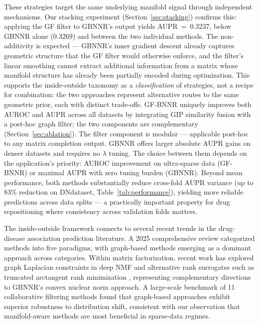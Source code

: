 \documentclass[unnumsec,webpdf,contemporary,large]{oup-authoring-template}
\begin{document}
These strategies target the same underlying manifold signal through independent mechanisms. Our stacking experiment (Section~\ref{sec:stacking}) confirms this: applying the GF filter to GBNNR's output yields AUPR~=~0.3237, below GBNNR alone (0.3269) and between the two individual methods. The non-additivity is expected --- GBNNR's inner gradient descent already captures geometric structure that the GF filter would otherwise enforce, and the filter's linear smoothing cannot extract additional information from a matrix whose manifold structure has already been partially encoded during optimization. This supports the inside-outside taxonomy as a \textit{classification} of strategies, not a recipe for combination: the two approaches represent alternative routes to the same geometric prior, each with distinct trade-offs. GF-BNNR uniquely improves both AUROC and AUPR across all datasets by integrating GIP similarity fusion with a post-hoc graph filter; the two components are complementary (Section~\ref{sec:ablation}). The filter component is modular --- applicable post-hoc to any matrix completion output. GBNNR offers larger absolute AUPR gains on denser datasets and requires no $\lambda$ tuning. The choice between them depends on the application's priority: AUROC improvement on ultra-sparse data (GF-BNNR) or maximal AUPR with zero tuning burden (GBNNR). Beyond mean performance, both methods substantially reduce cross-fold AUPR variance (up to 83\% reduction on DNdataset, Table~\ref{tab:performance}), yielding more reliable predictions across data splits --- a practically important property for drug repositioning where consistency across validation folds matters.

The inside-outside framework connects to several recent trends in the drug-disease association prediction literature. A 2025 comprehensive review \citep{huang2025} categorized methods into five paradigms, with graph-based methods emerging as a dominant approach across categories. Within matrix factorization, recent work has explored graph Laplacian constraints in deep NMF \citep{yang2025dnmf} and alternative rank surrogates such as truncated arctangent rank minimization \citep{liu2025tarm}, representing complementary directions to GBNNR's convex nuclear norm approach. A large-scale benchmark of 11 collaborative filtering methods \citep{reda2025} found that graph-based approaches exhibit superior robustness to distribution shift, consistent with our observation that manifold-aware methods are most beneficial in sparse-data regimes.
\end{document}
